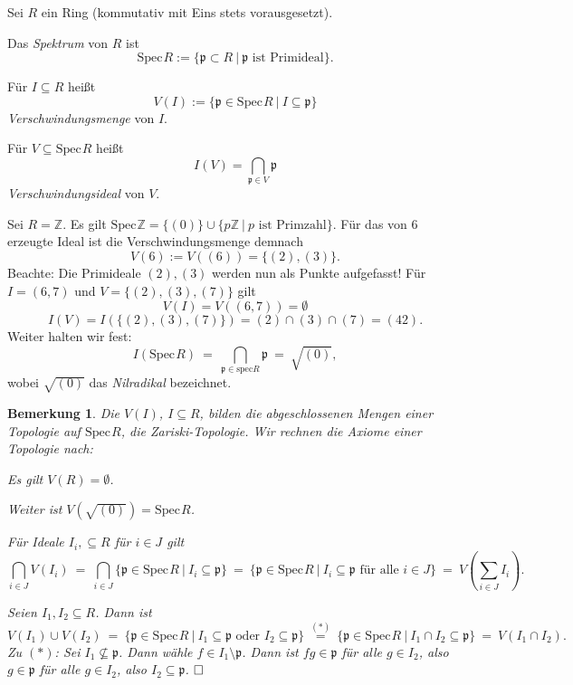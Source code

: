 \documentclass[11pt]{book}
\newtheorem{remark}[theorem]{Bemerkung}
\theoremstyle{nonumberbreak}
\newenvironment{defin}[1][]{\ifthenelse{\equal{#1}{}}{\definition}{\definition[#1]}\rm}{\enddefinition}
\newenvironment{pr}[1][]{\ifthenelse{\equal{#1}{}}{\proof}{\proof[#1]}\rm}{\endproof}
\newenvironment{ex}[1][]{\ifthenelse{\equal{#1}{}}{\example}{\example[#1]}\rm}{\endexample}
\newcommand{\spec}{\mathrm{Spec} \hspace{1pt} }
\newcommand{\p}{\mathfrak{p}}
\newcommand{\ideal}{\subseteq}
\begin{document}
\begin{spacing}{1.4}
\begin{defin}   %
Sei $R$ ein Ring (kommutativ mit Eins stets vorausgesetzt). 
\begin{compactenum}
\item Das \textit{Spektrum} von $R$ ist 
$$\spec R := \{ \mathfrak{p} \subset R \ \vert \ \mathfrak{p} \textrm{ ist Primideal} \}.$$
\item Für $I \subseteq R$ heißt
$$V(I) :=\{ \mathfrak{p} \in \spec R \ \vert \ I \subseteq \mathfrak{p} \}$$ \textit{Verschwindungsmenge} von $I$.
\item Für $V \subseteq \spec R$ heißt 
$$I(V)= \bigcap_{\mathfrak{p} \in V } \mathfrak{p}$$
\textit{Verschwindungsideal} von $V$.
\end{compactenum}
\end{defin}


\begin{ex}   %
Sei $R=\mathbb{Z}$. Es gilt $\spec \mathbb{Z}= \{ ( 0 ) \} \cup \{ p \mathbb{Z} \ \vert \ p \textrm{ ist Primzahl} \}$. Für das von $6$ erzeugte Ideal ist die Verschwindungsmenge demnach
$$V(6) := V(( 6 ) ) = \{( 2 ), ( 3 ) \}.$$
Beachte: Die Primideale $( 2 ), ( 3 )$ werden nun als Punkte aufgefasst!
Für $I=(6,7)$ und $V=\{(2),(3),(7)\}$ gilt
$$V(I)  = V( ( 6,7) ) = \emptyset$$
$$I(V)=I(\{(2),(3),(7)\})= (2) \cap (3) \cap (7)= ( 42).$$
Weiter halten wir fest:
$$I( \spec R) \ = \ \bigcap_{\mathfrak{p} \in \textrm{spec}R} \mathfrak{p} \ =\ \sqrt{( 0 )},$$
wobei $\sqrt{( 0 )}$ das \textit{Nilradikal} bezeichnet.
\end{ex}


\begin{remark}  %
Die $V(I)$, $I\subseteq R$, bilden die abgeschlossenen Mengen einer Topologie auf $\spec R$, die \textit{Zariski-Topologie}.
\begin{pr}
Wir rechnen die Axiome einer Topologie nach:
\begin{compactenum}
\item Es gilt $V(R)= \emptyset$.
\item Weiter ist $V\left( \sqrt{ ( 0 ) }\right) = \spec R$.
\item Für Ideale $I_i, \subseteq R$ für $i \in J$ gilt
$$\bigcap_{i \in J} V(I_i) \ = \ \bigcap_{i \in J} \{ \p \in \spec R \ \vert \ I_i \subseteq \p \} \ = \ \{ \p \in \spec R \ \vert \ I_i \subseteq \p \textrm{ für alle } i \in J \} \ = \ V \left( \sum_{i \in J} I_i \right).$$
\item Seien $I_1, I_2 \ideal R$. Dann ist
$$V(I_1) \cup V(I_2) \ = \ \{ \p \in \spec R \ \vert \ I_1 \subseteq \p \textrm{ oder } I_2 \subseteq \p \}  \ \overset{(*)}{=} \ \{ \p \in \spec R \ \vert \ I_1 \cap I_2 \subseteq \p \} \ = \ V(I_1 \cap I_2).$$ 
Zu $(*)$: Sei $I_1 \nsubseteq \p$. Dann wähle $f \in I_1 \setminus \p$. Dann ist $fg \in \p$ für alle $g \in I_2$, also $g \in \p$ für alle $g \in I_2$, also $I_2 \subseteq \p$. $\hfill \Box$
\end{compactenum}
\end{pr}
\end{remark}


\end{spacing}
\end{document}
